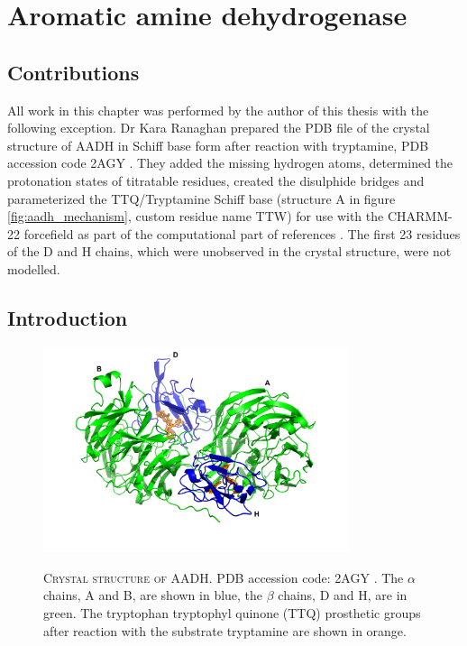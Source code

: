 %
%

\chapter{Aromatic amine dehydrogenase}
\label{chap:aadh}

\section*{Contributions}\label{sec:aadh_contributions}
All work in this chapter was performed by the author of this thesis with the following exception. Dr Kara Ranaghan prepared the PDB file of the crystal structure of AADH in Schiff base form after reaction with tryptamine, PDB accession code 2AGY \cite{masgrauAtomicDescriptionEnzyme2006}. They added the missing hydrogen atoms, determined the protonation states of titratable residues, created the disulphide bridges and parameterized the TTQ/Tryptamine Schiff base (structure A in figure \ref{fig:aadh_mechanism}, custom residue name TTW) for use with the CHARMM-22 forcefield \cite{admackerellAllAtomEmpiricalPotential1998} as part of the computational part of references \cite{masgrauAtomicDescriptionEnzyme2006, masgrauTunnelingClassicalPaths2007, ranaghanInitioQMMM2017}.  The first 23 residues of the D and H chains, which were unobserved in the crystal structure, were not modelled.

\section{Introduction}
\begin{figure}
    \centering
    \caption[Crystal structure of AADH]{\textsc{Crystal structure of AADH}. PDB accession code: 2AGY \cite{masgrauAtomicDescriptionEnzyme2006}. The $\alpha$ chains, A and B, are shown in blue, the $\beta$ chains, D and H, are in green. The tryptophan tryptophyl quinone (TTQ) prosthetic groups after reaction with the substrate tryptamine are shown in orange.}
    \includegraphics[width=0.8\textwidth]{chapters/aadh/figures/aadh_full_structure.png}
    \label{fig:aadh_full_structure}
\end{figure}

